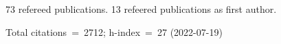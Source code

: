 73 refereed publications. 13 refeered publications as first author.

Total citations~=~2712; h-index~=~27 (2022-07-19)